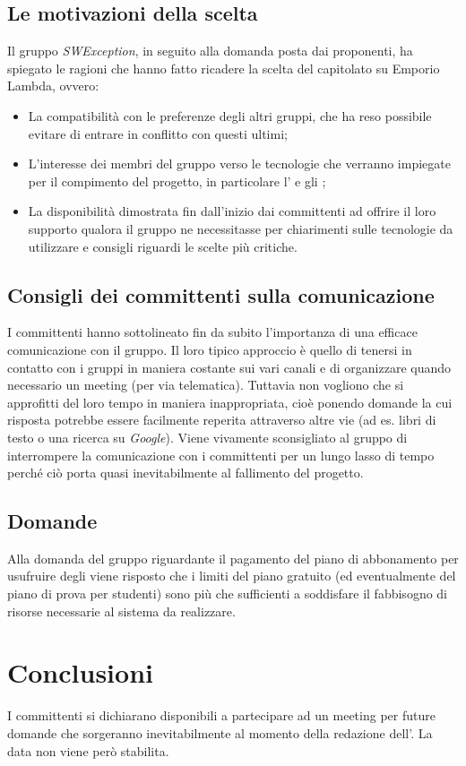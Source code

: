 \subsection{Le motivazioni della scelta}
Il gruppo \textit{SWException}, in seguito alla domanda posta dai proponenti, ha spiegato le ragioni che hanno fatto ricadere la scelta del capitolato su Emporio Lambda, ovvero:
	\begin{itemize}
	\item La compatibilità con le preferenze degli altri gruppi, che ha reso possibile evitare di entrare in conflitto con questi ultimi;
	\item L'interesse dei membri del gruppo verso le tecnologie che verranno impiegate per il compimento del progetto, in particolare l' e gli ;
	\item La disponibilità dimostrata fin dall'inizio dai committenti ad offrire il loro supporto qualora il gruppo ne necessitasse per chiarimenti sulle tecnologie da utilizzare e consigli riguardi le scelte più critiche.
	\end{itemize}
\subsection{Consigli dei committenti sulla comunicazione}
I committenti hanno sottolineato fin da subito l'importanza di una efficace comunicazione con il gruppo. 
Il loro tipico approccio è quello di tenersi in contatto con i gruppi in maniera costante sui vari canali  e di organizzare quando necessario un meeting (per via telematica).
Tuttavia non vogliono che si approfitti del loro tempo in maniera inappropriata, cioè ponendo domande la cui risposta potrebbe essere facilmente reperita attraverso altre vie (ad es. libri di testo o una ricerca su \textit{Google}).
Viene vivamente sconsigliato al gruppo di interrompere la comunicazione con i committenti per un lungo lasso di tempo perché ciò porta quasi inevitabilmente al fallimento del progetto.

\subsection{Domande}
Alla domanda del gruppo riguardante il pagamento del piano di abbonamento per usufruire degli  viene risposto che i limiti del piano gratuito (ed eventualmente del piano di prova per studenti) sono più che sufficienti a soddisfare il fabbisogno di risorse necessarie al sistema da realizzare.

\section{Conclusioni}
I committenti si dichiarano disponibili a partecipare ad un meeting per future domande che sorgeranno inevitabilmente al momento della redazione dell'. La data non viene però stabilita. 